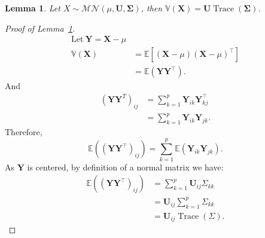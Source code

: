 \documentclass[a4paper,11pt]{article}
\theoremstyle{plain}
\newcommand{\1}{\mathbf{1}}
\newtheorem{lemma}{Lemma}
\begin{document}
\begin{lemma}\label{lemma_trace} 
 Let $X \sim \mathcal{MN}(\mu, \mathbf{U}, \mathbf{\Sigma})$, then $\mathbb{V}(\mathbf{X}) = \mathbf{U} \operatorname{Trace}(\mathbf{\Sigma})$.

\end{lemma}

\begin{proof}[Proof of Lemma~\ref{lemma_trace}]
 
  \begin{equation}
    \begin{aligned}
      \text{Let} ~ \mathbf{Y} = \mathbf{X} - \mu \\
      \mathbb{V}(\mathbf{X}) &= \mathbb{E}[(\mathbf{X}-\mu)(\mathbf{X}-\mu)^\top] \\
                             &= \mathbb{E}(\mathbf{Y}\mathbf{Y}^\top).
  \end{aligned}
  \end{equation}
  And
  \begin{equation}
    \begin{aligned}
      (\mathbf{Y}\mathbf{Y}^T)_{ij} &= \sum_{k=1}^p \mathbf{Y}_{ik} \mathbf{Y}^\top_{kj} \\
                                    &= \sum_{k=1}^p \mathbf{Y}_{ik} \mathbf{Y}_{jk}.
    \end{aligned}
  \end{equation}
  Therefore,
  \begin{equation}
      \mathbb{E}((\mathbf{Y}\mathbf{Y}^\top)_{ij}) = \sum_{k=1}^p \mathbb{E}(\mathbf{Y}_{ik} \mathbf{Y}_{jk}).
  \end{equation}
  As $\mathbf{Y}$ is centered, by definition of a normal matrix we have:
  \begin{equation}
    \begin{aligned}
      \mathbb{E}((\mathbf{Y}\mathbf{Y}^\top)_{ij})  &= \sum_{k=1}^p \mathbf{U}_{ij}\Sigma_{kk} \\
                                                    &= \mathbf{U}_{ij} \sum_{k=1}^p \Sigma_{kk} \\
                                                   &= \mathbf{U}_{ij} \operatorname{Trace}(\Sigma).
    \end{aligned}
  \end{equation}

\end{proof}
\end{document}

